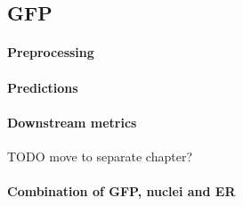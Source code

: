\subsection{GFP}
    \paragraph{Preprocessing}
        
    \paragraph{Predictions}
        
    \paragraph{Downstream metrics}
        TODO move to separate chapter?
        
    \paragraph{Combination of GFP, nuclei and ER}
        
